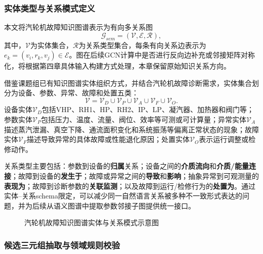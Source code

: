 \subsubsection{实体类型与关系模式定义}

本文将汽轮机故障知识图谱表示为有向多关系图
\begin{equation}
\mathcal{G}_{sem}=(\mathcal{V},\mathcal{E},\mathcal{R}),
\label{eq:kg_definition_v2}
\end{equation}
其中，$\mathcal{V}$为实体集合，$\mathcal{R}$为关系类型集合，每条有向关系边表示为$e_k=(v_i,r_k,v_j)\in\mathcal{E}$。图在后续GCN计算中是否进行反向边补充或邻接矩阵对称化，将根据第四章具体输入构建方式处理，本章保留原始知识关系方向。

借鉴课题组已有知识图谱实体组织方式\cite{YangHaodong2026CFB}，并结合汽轮机故障诊断需求，实体集合划分为设备、参数、异常、故障和处置五类：
\begin{equation}
\mathcal{V}=\mathcal{V}_{D}\cup\mathcal{V}_{P}\cup\mathcal{V}_{A}\cup\mathcal{V}_{F}\cup\mathcal{V}_{O}.
\end{equation}
设备实体$\mathcal{V}_{D}$包括VHP、RH1、HP、RH2、IP、LP、凝汽器、加热器和阀门等；参数实体$\mathcal{V}_{P}$包括压力、温度、流量、阀位、效率等可测或可计算量；异常实体$\mathcal{V}_{A}$描述蒸汽泄漏、真空下降、通流面积变化和系统振荡等偏离正常状态的现象；故障实体$\mathcal{V}_{F}$描述导致异常的具体故障或性能退化原因；处置实体$\mathcal{V}_{O}$表示运行调整或检修动作。

关系类型主要包括：参数到设备的\textbf{归属}关系；设备之间的\textbf{介质流向}和\textbf{介质/能量连接}；故障到设备的\textbf{发生于}；故障或异常之间的\textbf{导致}和\textbf{影响}；抽象异常到可观测量的\textbf{表现为}；故障到诊断参数的\textbf{关联监测}；以及故障到运行/检修行为的\textbf{处置为}。通过实体--关系schema限定，可以减少同一自然语言关系被多种不一致形式表达的问题，并为后续从语义图谱中提取参数邻接子图提供统一接口。

\begin{figure}[htbp]
\centering
{}
\caption{汽轮机故障知识图谱实体与关系模式示意图}
\label{fig:kg_schema}
\end{figure}

\subsubsection{候选三元组抽取与领域规则校验}

